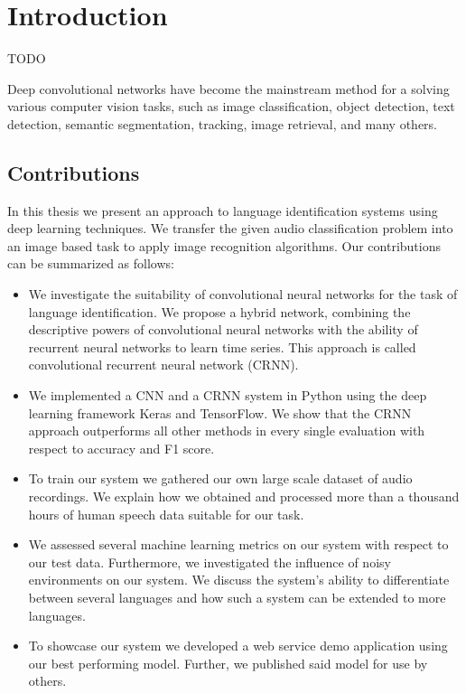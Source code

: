 \section{Introduction}

TODO

Deep convolutional networks have become the mainstream method for a solving various computer vision tasks, such as image classification\cite{russakovsky2015imagenet}, object detection\cite{russakovsky2015imagenet, everingham2010pascal}, text detection\cite{Yang2016SceneTextRegAR, jaderberg2014synthetic}, semantic segmentation\cite{dai2016instance, girshick2014rich}, tracking\cite{nam2016learning}, image retrieval\cite{tolias2015particular}, and many others.

\subsection{Contributions}
In this thesis we present an approach to language identification systems using deep learning techniques. We transfer the given audio classification problem into an image based task to apply image recognition algorithms. Our contributions can be summarized as follows:
\begin{itemize}
	\item We investigate the suitability of convolutional neural networks for the task of language identification. We propose a hybrid network, combining the descriptive powers of convolutional neural networks with the ability of recurrent neural networks to learn time series. This approach is called convolutional recurrent neural network (CRNN). 
	\item We implemented a CNN and a CRNN system in Python using the deep learning framework Keras and TensorFlow. We show that the CRNN approach outperforms all other methods in every single evaluation with respect to accuracy and F1 score.
	\item To train our system we gathered our own large scale dataset of audio recordings. We explain how we obtained and processed more than a thousand hours of human speech data suitable for our task.
	\item We assessed several machine learning metrics on our system with respect to our test data. Furthermore, we investigated the influence of noisy environments on our system. We discuss the system's ability to differentiate between several languages and how such a system can be extended to more languages.
	\item To showcase our system we developed a web service demo application using our best performing model. Further, we published said model for use by others.
\end{itemize} 


